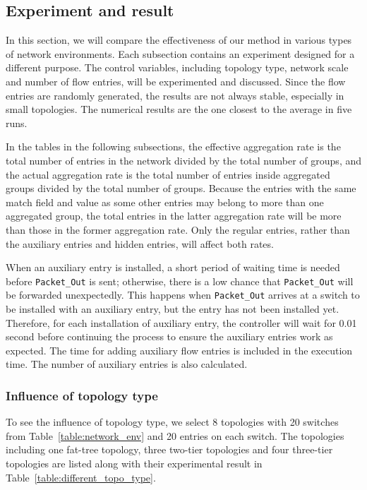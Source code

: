 \documentclass[conference]{IEEEtran}
\begin{document}
\subsection{Experiment and result}
In this section, we will compare the effectiveness of our method in various types of network environments. Each subsection contains an experiment designed for a different purpose. The control variables, including topology type, network scale and number of flow entries, will be experimented and discussed. Since the flow entries are randomly generated, the results are not always stable, especially in small topologies. The numerical results are the one closest to the average in five runs.

In the tables in the following subsections, the effective aggregation rate is the total number of entries in the network divided by the total number of groups, and the actual aggregation rate is the total number of entries inside aggregated groups divided by the total number of groups. Because the entries with the same match field and value as some other entries may belong to more than one aggregated group, the total entries in the latter aggregation rate will be more than those in the former aggregation rate. Only the regular entries, rather than the auxiliary entries and hidden entries, will affect both rates.

When an auxiliary entry is installed, a short period of waiting time is needed before \texttt{Packet\_Out} is sent; otherwise, there is a low chance that \texttt{Packet\_Out} will be forwarded unexpectedly. This happens when \texttt{Packet\_Out} arrives at a switch to be installed with an auxiliary entry, but the entry has not been installed yet. Therefore, for each installation of auxiliary entry, the controller will wait for 0.01 second before continuing the process to ensure the auxiliary entries work as expected. The time for adding auxiliary flow entries is included in the execution time. The number of auxiliary entries is also calculated.

\subsubsection{Influence of topology type}
To see the influence of topology type, we select 8 topologies with 20 switches from Table~\ref{table:network_env} and 20 entries on each switch. The topologies including one fat-tree topology, three two-tier topologies and four three-tier topologies are listed along with their experimental result in Table~\ref{table:different_topo_type}. 
\end{document}
